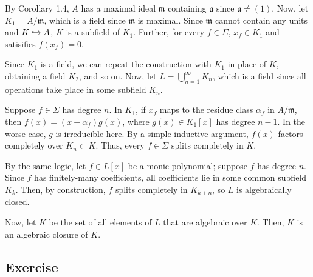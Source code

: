 By Corollary 1.4, $A$ has a maximal ideal $\mathfrak{m}$ containing $\mathfrak{a}$ since $\mathfrak{a} \neq (1)$. Now, let $K_1 = A/\mathfrak{m}$,
which is a field since $\mathfrak{m}$ is maximal. Since $\mathfrak{m}$ cannot contain any units and $K \xhookrightarrow{} A$, 
$K$ is a subfield of $K_1$. Further, for every $f \in \Sigma$, $x_f \in K_1$ and satisifies $f(x_f) = 0$.

Since $K_1$ is a field, we can repeat the construction with $K_1$ in place of $K$, obtaining a field $K_2$, and so on. Now, 
let $L = \bigcup_{n=1}^{\infty} K_n$, which is a field since all operations take place in some subfield $K_n$.

Suppose $f \in \Sigma$ has degree $n$. In $K_1$, if $x_f$ maps to the residue class $\alpha_f$ in $A/\mathfrak{m}$, then $f(x) = (x-\alpha_f)g(x)$, where
$g(x) \in K_1[x]$ has degree $n-1$. In the worse case, $g$ is irreducible here. By a simple inductive argument, $f(x)$ factors completely over $K_n \subset K$.
Thus, every $f \in \Sigma$ splits completely in $K$.

By the same logic, let $f \in L[x]$ be a monic polynomial; suppose $f$ has degree $n$. Since $f$ has finitely-many coefficients, all coefficients lie in some
common subfield $K_k$. Then, by construction, $f$ splits completely in $K_{k+n}$, so $L$ is algebraically closed.

Now, let $\overline{K}$ be the set of all elements of $L$ that are algebraic over $K$. Then, $\overline{K}$ is an algebraic closure of $K$.

\subsection{Exercise}\label{1.14}

